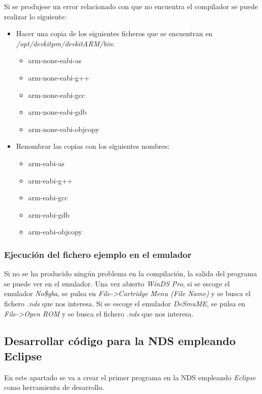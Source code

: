 Si se produjese un error relacionado con que no encuentra el compilador se puede realizar lo siguiente:
\begin{itemize}
\item Hacer una copia de los siguientes ficheros que se encuentran en \textit{/opt/devkitpro/devkitARM/bin}:	
	\begin{itemize}
 	\item arm-none-eabi-as
 	\item arm-none-eabi-g++
 	\item arm-none-eabi-gcc	
 	\item arm-none-eabi-gdb
    \item arm-none-eabi-objcopy
	\end{itemize}
\item Renombrar las copias con los siguientes nombres:	
	\begin{itemize}
 	\item arm-eabi-as
 	\item arm-eabi-g++
 	\item arm-eabi-gcc	
 	\item arm-eabi-gdb
    \item arm-eabi-objcopy
    \end{itemize}
\end{itemize}

\subsubsection{Ejecución del fichero ejemplo en el emulador}
Si no se ha producido ningún problema en la compilación, la salida del programa se puede ver en el emulador. Una vez abierto \textit{WinDS Pro}, si se escoge el emulador \textit{No\$gba}, se pulsa en \textit{File->Cartridge Menu (File Name)} y se busca el fichero \textit{.nds} que nos interesa. Si se escoge el emulador \textit{DeSmuME}, se pulsa en \textit{File->Open ROM} y se busca el fichero \textit{.nds} que nos interesa.


\subsection{Desarrollar código para la NDS empleando Eclipse}
En este apartado se va a crear el primer programa en la NDS empleando \textit{Eclipse} como herramienta de desarrollo.


